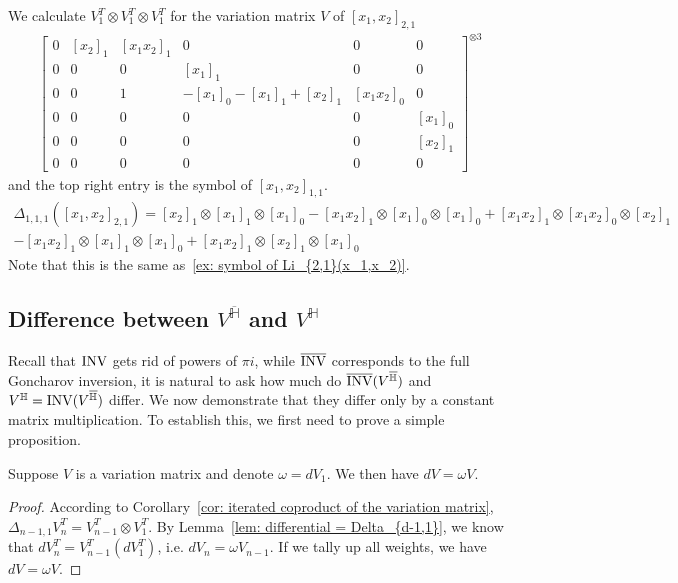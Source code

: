 \begin{example}
We calculate $V_1^T\otimes V_1^T\otimes V_1^T$ for the variation matrix $V$ of $[x_1,x_2]_{2,1}$
\begin{multline}
\begin{bmatrix}
0&[x_2]_1&[x_1x_2]_1&0&0&0\\
0&0&0&[x_1]_1&0&0\\
0&0&1&-[x_1]_0-[x_1]_1+[x_2]_1&[x_1x_2]_0&0\\
0&0&0&0&0&[x_1]_0\\
0&0&0&0&0&[x_2]_1\\
0&0&0&0&0&0
\end{bmatrix}^{\otimes 3}
\end{multline}
and the top right entry is the symbol of $[x_1,x_2]_{1,1}$.
\begin{multline}
\Delta_{1,1,1}([x_1,x_2]_{2,1})=[x_2]_1\otimes[x_1]_1\otimes[x_1]_0-[x_1 x_2]_1\otimes [x_1]_0\otimes [x_1]_0+[x_1 x_2]_1\otimes [x_1x_2]_0\otimes [x_2]_1\\
-[x_1 x_2]_1\otimes
   [x_1]_1\otimes [x_1]_0+[x_1 x_2]_1\otimes [x_2]_1\otimes [x_1]_0
\end{multline}
Note that this is the same as~\eqref{ex: symbol of Li_{2,1}(x_1,x_2)}.
\end{example}

\subsection{Difference between $V^{\overline{\mathbb H}}$ and $V^{\mathbb H}$}

Recall that $\operatorname{INV}$ gets rid of powers of $\pi i$, while $\overline{\operatorname{INV}}$ corresponds to the full Goncharov inversion, it is natural to ask how much do $\overline{\operatorname{INV}}(V^{\overline{\mathbb H}})$ and $V^{\mathbb H}=\operatorname{INV}(V^{\overline{\mathbb H}})$ differ. We now demonstrate that they differ only by a constant matrix multiplication. To establish this, we first need to prove a simple proposition.

\begin{proposition}\label{prop: dV=omega V}
Suppose $V$ is a variation matrix and denote $\omega=dV_1$. We then have $dV=\omega V$.
\end{proposition}

\begin{proof}
According to Corollary~\ref{cor: iterated coproduct of the variation matrix}, $\Delta_{n-1,1}V_n^T=V_{n-1}^T\otimes V_1^T$. By Lemma~\ref{lem: differential = Delta_{d-1,1}}, we know that $dV_n^T=V_{n-1}^T(dV_1^T)$, i.e. $dV_n=\omega V_{n-1}$. If we tally up all weights, we have $dV=\omega V$.
\end{proof}

